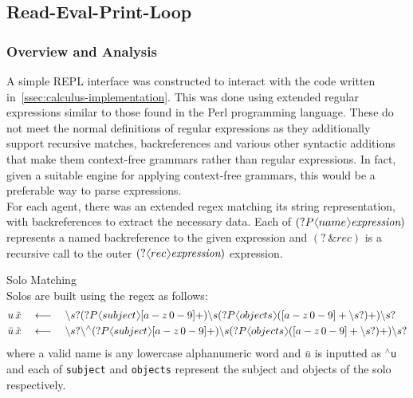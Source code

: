 \subsection{Read-Eval-Print-Loop}

    \subsubsection{Overview and Analysis}
        A simple REPL interface was constructed to interact with the code written in~\ref{ssec:calculus-implementation}.
        This was done using extended regular expressions similar to those found in the Perl programming language.
        These do not meet the normal definitions of regular expressions as they additionally support recursive matches, backreferences and various other syntactic additions that make them context-free grammars rather than regular expressions.
        In fact, given a suitable engine for applying context-free grammars, this would be a preferable way to parse expressions. \\

        For each agent, there was an extended regex matching its string representation, with backreferences to extract the necessary data.
        Each of $(?P\langl name \rangl \textit{expression})$ represents a named backreference to the given expression and $(? \, \& rec)$ is a recursive call to the outer $(?\langl rec \rangl \textit{expression})$ expression.
        
        \begin{definition}{Solo Matching\\}
            Solos are built using the regex as follows:
            \begin{align*}
                u \, \tilde{x}       & \quad \longleftarrow \quad \backslash s? (?P \langl subject \rangl [a-z \, 0-9]+) \backslash s (?P \langl objects \rangl ([a-z \, 0-9]+ \backslash s?)+) \backslash s? \\
                \bar{u} \, \tilde{x} & \quad \longleftarrow \quad \backslash s? \backslash ^{\wedge} (?P \langl subject \rangl [a-z \, 0-9]+) \backslash s (?P \langl objects \rangl ([a-z \, 0-9]+ \backslash s?)+) \backslash s?
            \end{align*}
            where a valid name is any lowercase alphanumeric word and $\bar{u}$ is inputted as \texttt{$^{\wedge}$u} and each of \texttt{subject} and \texttt{objects} represent the subject and objects of the solo respectively.
        \end{definition}

